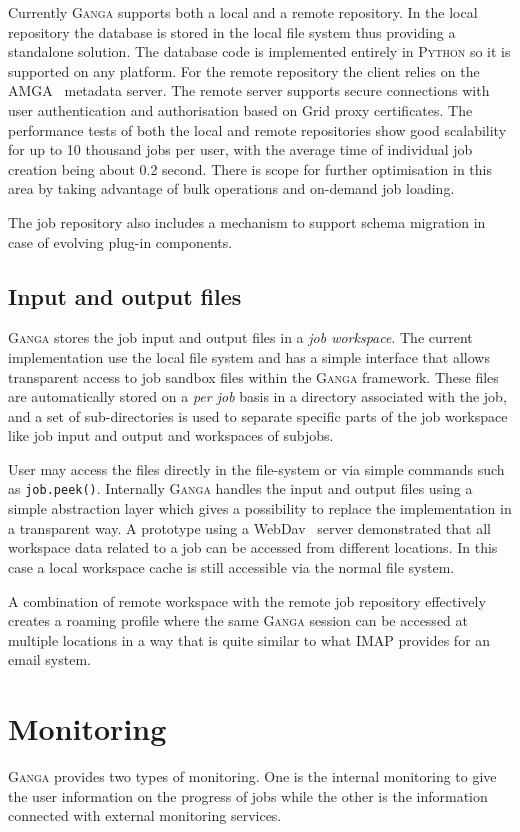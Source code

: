 \documentclass{elsart}
\def\ganga {\textsc{Ganga}\xspace}
\def\python {\textsc{Python}\xspace}
\def\grid {Grid\xspace}
\begin{document}
Currently \ganga supports both a local and a remote repository. In the local
repository the database is stored in the local file system thus providing a
standalone solution. The database code is implemented entirely in \python so
it is supported on any platform. For the remote repository the client relies
on the AMGA~\cite{AMGA} metadata server. The remote server supports secure
connections with user authentication and authorisation based on \grid proxy
certificates. The performance tests of both the local and remote repositories
show good scalability for up to 10 thousand jobs per user, with the average
time of individual job creation being about 0.2 second. There is scope for
further optimisation in this area by taking advantage of bulk operations and
on-demand job loading.

The job repository also includes a mechanism to support schema migration in
case of evolving plug-in components.

\subsection{Input and output files}

\ganga stores the job input and output files in a \emph{job workspace}. 
The current implementation use the local file system and has a simple
interface that allows transparent access to job sandbox files within the
\ganga framework. These files are automatically stored on a \emph{per job}
basis in a directory associated with the job, and a set of sub-directories is
used to separate specific parts of the job workspace like job input and output
and workspaces of subjobs.

User may access the files directly in the file-system or via simple commands
such as \texttt{job.peek()}. Internally \ganga handles the input and output
files using a simple abstraction layer which gives a possibility to replace
the implementation in a transparent way. A prototype using a
WebDav~\cite{WebDav} server demonstrated that all workspace data related to a
job can be accessed from different locations. In this case a local workspace
cache is still accessible via the normal file system.

A combination of remote workspace with the remote job repository effectively
creates a roaming profile where the same \ganga session can be accessed at
multiple locations in a way that is quite similar to what IMAP provides for an
email system.

\section{Monitoring}
\label{sec:mon}
\ganga provides two types of monitoring. One is the internal monitoring to
give the user information on the progress of jobs while the other is the
information connected with external monitoring services.
\end{document}
